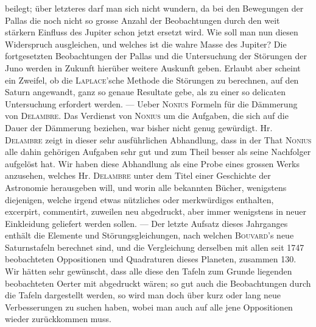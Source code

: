 beilegt; über letzteres darf man sich nicht wundern, da bei den Bewegungen der Pallas die noch nicht so grosse Anzahl der Beobachtungen durch den weit stärkern Einfluss des Jupiter schon jetzt ersetzt wird. Wie soll man nun diesen Widerspruch ausgleichen, und welches ist die wahre Masse des Jupiter? Die fortgesetzten Beobachtungen der Pallas und die Untersuchung der Störungen der Juno werden in Zukunft hierüber weitere Auskunft geben. Erlaubt aber scheint ein Zweifel, ob die \textsc{Laplace}'sche Methode die Störungen zu berechnen, auf den Saturn angewandt, ganz so genaue Resultate gebe, als zu einer so delicaten Untersuchung erfordert werden. --- Ueber \textsc{Nonius} Formeln für die Dämmerung von \textsc{Delambre}. Das Verdienst von \textsc{Nonius} um die Aufgaben, die sich auf die Dauer der Dämmerung beziehen, war bisher nicht genug gewürdigt. Hr. \textsc{Delambre} zeigt in dieser sehr ausführlichen Abhandlung, dass in der That \textsc{Nonius} alle dahin gehörigen Aufgaben sehr gut und zum Theil besser als seine Nachfolger aufgelöst hat. Wir haben diese Abhandlung als eine Probe eines grossen Werks anzusehen, welches Hr. \textsc{Delambre} unter dem Titel einer Geschichte der Astronomie herausgeben will, und worin alle bekannten Bücher, wenigstens diejenigen, welche irgend etwas nützliches oder merkwürdiges enthalten, excerpirt, commentirt, zuweilen neu abgedruckt, aber immer wenigstens in neuer Einkleidung geliefert werden sollen. --- Der letzte Aufsatz dieses Jahrganges enthält die Elemente und Störungsgleichungen, nach welchen \textsc{Bouvard}'s neue Saturnstafeln berechnet sind, und die Vergleichung derselben mit allen seit 1747 beobachteten Oppositionen und Quadraturen dieses Planeten, zusammen 130. Wir hätten sehr gewünscht, dass alle diese den Tafeln zum Grunde liegenden beobachteten Oerter mit abgedruckt wären; so gut auch die Beobachtungen durch die Tafeln dargestellt werden, so wird man doch über kurz oder lang neue Verbesserungen zu suchen haben, wobei man auch auf alle jene Oppositionen wieder zurückkommen muss.
